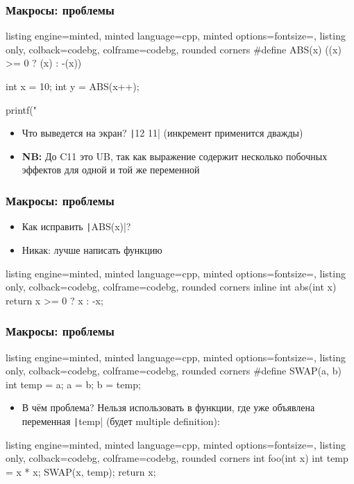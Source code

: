 \documentclass[10pt]{beamer}
\begin{document}
\begin{frame}[fragile]
\frametitle{Макросы: проблемы}
\begin{tcblisting}{listing engine=minted, minted language=cpp, minted options={fontsize=\scriptsize}, listing only, colback=codebg, colframe=codebg, rounded corners}
#define ABS(x) ((x) >= 0 ? (x) : -(x))

int x = 10;
int y = ABS(x++);

printf("%
\end{tcblisting}
\pause
{}
\begin{itemize}
\item Что выведется на экран? \pause \texttt|12 11| (инкремент применится дважды)
\pause
\item \textbf{NB:} До C11 это UB, так как выражение содержит несколько побочных эффектов для одной и той же переменной
\end{itemize}
\end{frame}

\begin{frame}[fragile]
\frametitle{Макросы: проблемы}
\begin{itemize}
\item Как исправить \texttt|ABS(x)|?
\pause
\item Никак: лучше написать функцию
\end{itemize}
\begin{tcblisting}{listing engine=minted, minted language=cpp, minted options={fontsize=\scriptsize}, listing only, colback=codebg, colframe=codebg, rounded corners}
inline int abs(int x) {
  return x >= 0 ? x : -x;
}
\end{tcblisting}
\end{frame}

\begin{frame}[fragile]
\frametitle{Макросы: проблемы}
\begin{tcblisting}{listing engine=minted, minted language=cpp, minted options={fontsize=\scriptsize}, listing only, colback=codebg, colframe=codebg, rounded corners}
#define SWAP(a, b) int temp = a; a = b; b = temp;
\end{tcblisting}
\pause
{}
\begin{itemize}
\item В чём проблема? \pause Нельзя использовать в функции, где уже объявлена переменная \texttt|temp| (будет multiple definition):
\end{itemize}
\begin{tcblisting}{listing engine=minted, minted language=cpp, minted options={fontsize=\scriptsize}, listing only, colback=codebg, colframe=codebg, rounded corners}
int foo(int x) {
  int temp = x * x;
  SWAP(x, temp);
  return x;
}
\end{tcblisting}
\end{frame}
\end{document}
